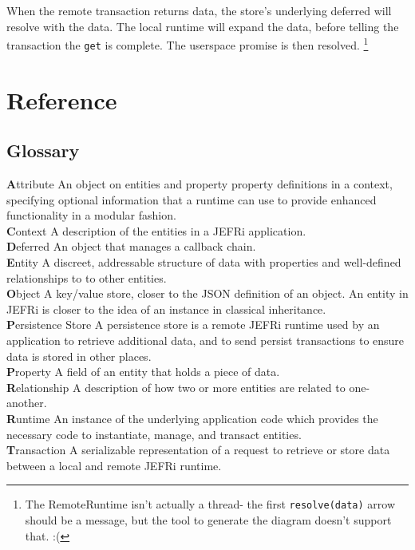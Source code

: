 \documentclass{article}
\newcommand{\ilcode}{\tt}
\renewcommand{\glossary}[2]{{\large \textbf #1} #2 \\ }
\begin{document}
When the remote transaction returns data, the store's underlying deferred will
resolve with the data. The local runtime will expand the data, before telling
the transaction the {\ilcode get} is complete. The userspace promise is then
resolved. \footnote{The RemoteRuntime isn't actually a thread- the first
{\ilcode resolve(data)} arrow should be a message, but the tool to generate the
diagram doesn't support that. :(}

\newpage
\section{Reference}

\subsection{Glossary}


\glossary{Attribute}{An object on entities and property property definitions in a context, specifying optional information that a runtime can use to provide enhanced functionality in a modular fashion.}
\glossary{Context}{A description of the entities in a JEFRi application.}
\glossary{Deferred}{An object that manages a callback chain.}
\glossary{Entity}{A discreet, addressable structure of data with properties and well-defined relationships to to other entities.}
\glossary{Object}{A key/value store, closer to the JSON definition of an object. An entity in JEFRi is closer to the idea of an instance in classical inheritance.}
\glossary{Persistence Store}{A persistence store is a remote JEFRi runtime used by an application to retrieve additional data, and to send persist transactions to ensure data is stored in other places.}
\glossary{Property}{A field of an entity that holds a piece of data.}
\glossary{Relationship}{A description of how two or more entities are related to one-another.}
\glossary{Runtime}{An instance of the underlying application code which provides the necessary code to instantiate, manage, and transact entities.}
\glossary{Transaction}{A serializable representation of a request to retrieve or store data between a local and remote JEFRi runtime.}
\end{document}
